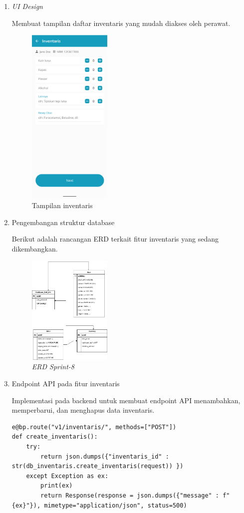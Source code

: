 \begin{enumerate}
\item \textit{UI Design}

Membuat tampilan daftar inventaris yang mudah diakses oleh perawat.
	\begin{figure}[H]
		\centering
		\includegraphics[keepaspectratio, width=4cm]{gambar/tampilan_inventaris}
		\caption{Tampilan inventaris}
		\label{gambar:tampilan_inventaris}
	\end{figure}
\item Pengembangan struktur database

Berikut adalah rancangan ERD terkait fitur inventaris yang sedang dikembangkan.
	\begin{figure}[H]
		\centering
		\includegraphics[keepaspectratio, width=4cm]{gambar/erd_sprint_8}
		\caption{\textit{ERD Sprint-8}}
		\label{gambar:erd_sprint_8}
	\end{figure}
\item Endpoint API pada fitur inventaris

Implementasi pada backend untuk membuat endpoint API menambahkan, memperbarui, dan menghapus data inventaris. 
\begin{lstlisting}
e@bp.route("v1/inventaris/", methods=["POST"])
def create_inventaris():
    try:
        return json.dumps({"inventaris_id" : str(db_inventaris.create_inventaris(request)) })
    except Exception as ex:
        print(ex)
        return Response(response = json.dumps({"message" : f"{ex}"}), mimetype="application/json", status=500)
    

\end{lstlisting}
\end{enumerate}
